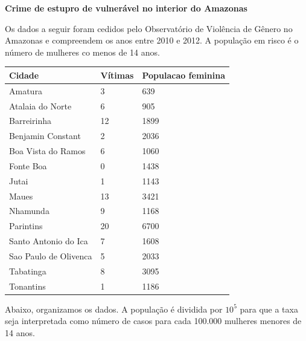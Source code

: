 \documentclass[
  letterpaper,
  DIV=11,
  numbers=noendperiod]{scrreprt}
\theoremstyle{plain}
\theoremstyle{definition}
\theoremstyle{definition}
\theoremstyle{remark}
\begin{document}
\label{exm}
\textbf{Crime de estupro de vulnerável no interior do Amazonas}

Os dados a seguir foram cedidos pelo Observatório de Violência de Gênero
no Amazonas e compreendem os anos entre 2010 e 2012. A população em
risco é o número de mulheres co menos de 14 anos.

\begin{longtable}[]{@{}lll@{}}
\toprule\noalign{}
Cidade & Vítimas & Populacao feminina \\
\midrule\noalign{}
\endhead
\bottomrule\noalign{}
\endlastfoot
Amatura & 3 & 639 \\
Atalaia do Norte & 6 & 905 \\
Barreirinha & 12 & 1899 \\
Benjamin Constant & 2 & 2036 \\
Boa Vista do Ramos & 6 & 1060 \\
Fonte Boa & 0 & 1438 \\
Jutai & 1 & 1143 \\
Maues & 13 & 3421 \\
Nhamunda & 9 & 1168 \\
Parintins & 20 & 6700 \\
Santo Antonio do Ica & 7 & 1608 \\
Sao Paulo de Olivenca & 5 & 2033 \\
Tabatinga & 8 & 3095 \\
Tonantins & 1 & 1186 \\
\end{longtable}

Abaixo, organizamos os dados. A população é dividida por \(10^5\) para
que a taxa seja interpretada como número de casos para cada 100.000
mulheres menores de 14 anos.
\end{document}
